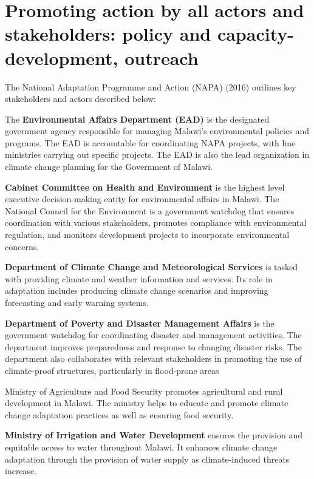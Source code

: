 \documentclass[
]{book}
\begin{document}
\hypertarget{promoting-action-by-all-actors-and-stakeholders-policy-and-capacity-development-outreach}{%
\section{Promoting action by all actors and stakeholders: policy and capacity-development, outreach}\label{promoting-action-by-all-actors-and-stakeholders-policy-and-capacity-development-outreach}}

The National Adaptation Programme and Action (NAPA) (2016) outlines key stakeholders and actors described below:

The \textbf{Environmental Affairs Department (EAD)} is the designated government agency responsible for managing Malawi's environmental policies and programs. The EAD is accountable for coordinating NAPA projects, with line ministries carrying out specific projects. The EAD is also the lead organization in climate change planning for the Government of Malawi.

\textbf{Cabinet Committee on Health and Environment} is the highest level executive decision-making entity for environmental affairs in Malawi. The National Council for the Environment is a government watchdog that ensures coordination with various stakeholders, promotes compliance with environmental regulation, and monitors development projects to incorporate environmental concerns.

\textbf{Department of Climate Change and Meteorological Services} is tasked with providing climate and weather information and services. Its role in adaptation includes producing climate change scenarios and improving forecasting and early warning systems.

\textbf{Department of Poverty and Disaster Management Affairs} is the government watchdog for coordinating disaster and management activities. The department improves preparedness and response to changing disaster risks. The department also collaborates with relevant stakeholders in promoting the use of climate-proof structures, particularly in flood-prone
areas

Ministry of Agriculture and Food Security promotes agricultural and rural development in Malawi. The ministry helps to educate and promote climate change adaptation practices as well as ensuring food security.

\textbf{Ministry of Irrigation and Water Development} ensures the provision and equitable access to water throughout Malawi. It enhances climate change adaptation through the provision of water supply as climate-induced threats increase.
\end{document}
